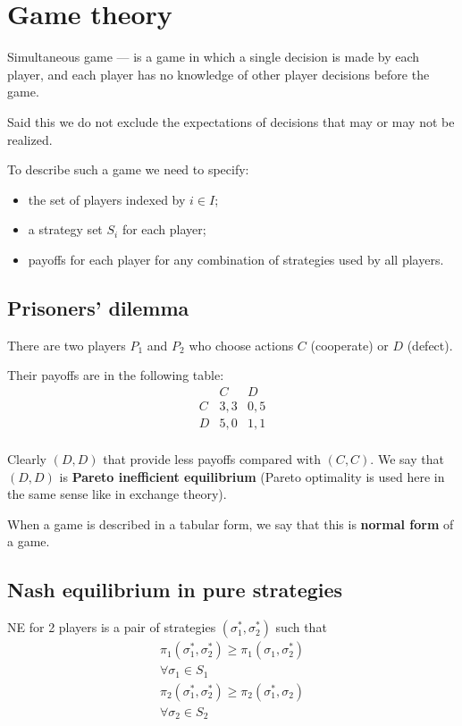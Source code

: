 \documentclass[a4paper, 10pt]{article}
\begin{document}
\section{Game theory}
 Simultaneous game — is a game in which a single decision is made by each player, and each player has no knowledge of other player decisions before the game.

Said this we do not exclude the expectations of decisions that may or may not be realized.

To describe such a game we need to specify:
\begin{itemize}
    \item the set of players indexed by $i \in I$;
    \item a strategy set $S_i$ for each player;
    \item payoffs for each player for any combination of strategies used by all players.
\end{itemize}

\subsection{Prisoners' dilemma}
There are two players $P_1$ and $P_2$ who choose actions $C$ (cooperate) or $D$ (defect).

Their payoffs are in the following table:
$$\begin{array}{c|c|c} 
    & C & D \\ \hline
    C & 3,3 & 0,5 \\ \hline
    D & 5,0 & 1,1 \\
  \end{array}
$$

Clearly $(D, D)$ that provide less payoffs compared with $(C, C)$. We say that $(D, D)$ is \textbf{Pareto inefficient equilibrium} (Pareto optimality is used here in the same sense like in exchange theory).

When a game is described in a tabular form, we say that this is \textbf{normal form} of a game.

\subsection{Nash equilibrium in pure strategies}
 NE for 2 players is a pair of strategies $\left(\sigma_1^*, \sigma_2^*\right)$ such that
$$
\begin{gathered}
\pi_1\left(\sigma_1^*, \sigma_2^*\right) \geqslant \pi_1\left(\sigma_1, \sigma_2^*\right) \\
\forall \sigma_1 \in S_1 \\
\pi_2\left(\sigma_1^*, \sigma_2^*\right) \geqslant \pi_2\left(\sigma_1^*, \sigma_2\right) \\
\forall \sigma_2 \in S_2
\end{gathered}
$$
\end{document}
